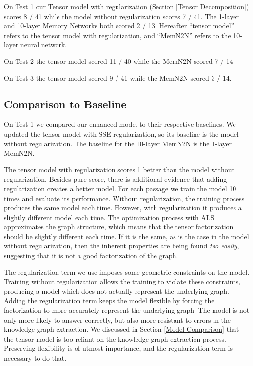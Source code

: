 \documentclass[pageno]{jpaper}
\begin{document}
On Test 1 our Tensor model with regularization (Section \ref{Tensor
Decomposition}) scores 8 / 41 while the model without regularization scores 7 /
41. The 1-layer and 10-layer Memory Networks both scored 2 / 13. Hereafter
``tensor model'' refers to the tensor model with regularization, and ``MemN2N''
refers to the 10-layer neural network.

On Test 2 the tensor model scored 11 / 40 while the MemN2N scored 7 / 14.

On Test 3 the tensor model scored 9 / 41 while the MemN2N scored 3 / 14.

\subsection{Comparison to Baseline}
\label{Comparison to Baseline}

On Test 1 we compared our enhanced model to their respective baselines. We
updated the tensor model with SSE regularization, so its baseline is the model
without regularization. The baseline for the 10-layer MemN2N is the 1-layer
MemN2N.

The tensor model with regularization scores 1 better than the model without
regularization. Besides pure score, there is additional evidence that adding
regularization creates a better model. For each passage we train the model 10
times and evaluate its performance. Without regularization, the training process
produces the same model each time. However, with regularization it produces a
slightly different model each time. The optimization process with ALS
approximates the graph structure, which means that the tensor factorization
should be slightly different each time. If it is the same, as is the case in the
model without regularization, then the inherent properties are being found
\textit{too easily}, suggesting that it is not a good factorization of the
graph.

The regularization term we use imposes some geometric constraints on the model.
Training without regularization allows the training to violate these
constraints, producing a model which does not actually represent the underlying
graph. Adding the regularization term keeps the model flexible by forcing the
factorization to more accurately represent the underlying graph. The model is
not only more likely to answer correctly, but also more resistant to errors in
the knowledge graph extraction. We discussed in Section \ref{Model Comparison}
that the tensor model is too reliant on the knowledge graph extraction process.
Preserving flexibility is of utmost importance, and the regularization term is
necessary to do that.
\end{document}
